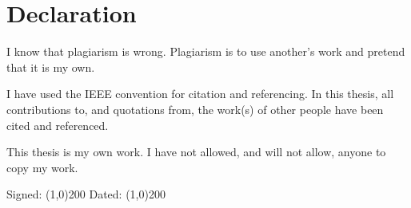 \chapter*{Declaration}
I know that plagiarism is wrong. Plagiarism is to use another's work and pretend that it is my own.

I have used the IEEE convention for citation and referencing. In this thesis, all contributions to, and quotations from, the work(s) of other people have been cited and referenced. 

This thesis is my own work. I have not allowed, and will not allow, anyone to copy my work.
\vskip100pt
\begin{center}
	Signed: \line(1,0){200}
	\vskip20pt
	Dated: \line(1,0){200}
\end{center}

\newpage